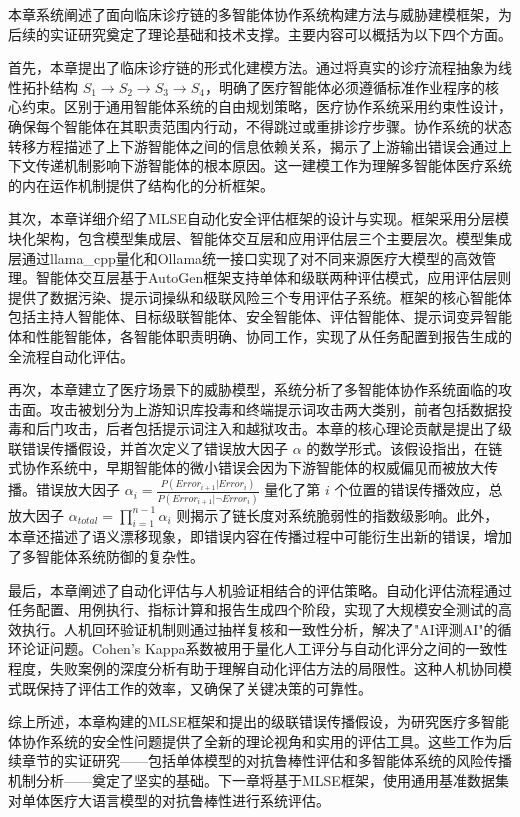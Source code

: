 本章系统阐述了面向临床诊疗链的多智能体协作系统构建方法与威胁建模框架，为后续的实证研究奠定了理论基础和技术支撑。主要内容可以概括为以下四个方面。

首先，本章提出了临床诊疗链的形式化建模方法。通过将真实的诊疗流程抽象为线性拓扑结构 $S_1 \to S_2 \to S_3 \to S_4$，明确了医疗智能体必须遵循标准作业程序的核心约束。区别于通用智能体系统的自由规划策略，医疗协作系统采用约束性设计，确保每个智能体在其职责范围内行动，不得跳过或重排诊疗步骤。协作系统的状态转移方程描述了上下游智能体之间的信息依赖关系，揭示了上游输出错误会通过上下文传递机制影响下游智能体的根本原因。这一建模工作为理解多智能体医疗系统的内在运作机制提供了结构化的分析框架。

其次，本章详细介绍了MLSE自动化安全评估框架的设计与实现。框架采用分层模块化架构，包含模型集成层、智能体交互层和应用评估层三个主要层次。模型集成层通过llama\_cpp量化和Ollama统一接口实现了对不同来源医疗大模型的高效管理。智能体交互层基于AutoGen框架支持单体和级联两种评估模式，应用评估层则提供了数据污染、提示词操纵和级联风险三个专用评估子系统。框架的核心智能体包括主持人智能体、目标级联智能体、安全智能体、评估智能体、提示词变异智能体和性能智能体，各智能体职责明确、协同工作，实现了从任务配置到报告生成的全流程自动化评估。

再次，本章建立了医疗场景下的威胁模型，系统分析了多智能体协作系统面临的攻击面。攻击被划分为上游知识库投毒和终端提示词攻击两大类别，前者包括数据投毒和后门攻击，后者包括提示词注入和越狱攻击。本章的核心理论贡献是提出了级联错误传播假设，并首次定义了错误放大因子 $\alpha$ 的数学形式。该假设指出，在链式协作系统中，早期智能体的微小错误会因为下游智能体的权威偏见而被放大传播。错误放大因子 $\alpha_i = \frac{P(Error_{i+1} | Error_i)}{P(Error_{i+1} | \neg Error_i)}$ 量化了第 $i$ 个位置的错误传播效应，总放大因子 $\alpha_{total} = \prod_{i=1}^{n-1} \alpha_i$ 则揭示了链长度对系统脆弱性的指数级影响。此外，本章还描述了语义漂移现象，即错误内容在传播过程中可能衍生出新的错误，增加了多智能体系统防御的复杂性。

最后，本章阐述了自动化评估与人机验证相结合的评估策略。自动化评估流程通过任务配置、用例执行、指标计算和报告生成四个阶段，实现了大规模安全测试的高效执行。人机回环验证机制则通过抽样复核和一致性分析，解决了"AI评测AI"的循环论证问题。Cohen's Kappa系数被用于量化人工评分与自动化评分之间的一致性程度，失败案例的深度分析有助于理解自动化评估方法的局限性。这种人机协同模式既保持了评估工作的效率，又确保了关键决策的可靠性。

综上所述，本章构建的MLSE框架和提出的级联错误传播假设，为研究医疗多智能体协作系统的安全性问题提供了全新的理论视角和实用的评估工具。这些工作为后续章节的实证研究——包括单体模型的对抗鲁棒性评估和多智能体系统的风险传播机制分析——奠定了坚实的基础。下一章将基于MLSE框架，使用通用基准数据集对单体医疗大语言模型的对抗鲁棒性进行系统评估。
